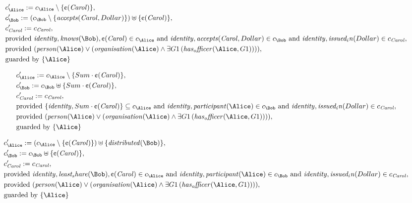 \begin{align*}
&
c'_
{
\Alice
}
 := 
c_
{
\Alice
}
 \setminus 
\{
\text{\textcent}
(
\mathit{Carol}
)
\}
,\\
&
c'_
{
\Bob
}
 := 
(c_
{
\Bob
}
 \setminus 
\{
\mathit{
accepts
}
(
\mathit{Carol}
,
Dollar
)
\}
) \uplus 
\{
\text{\textcent}
(
\mathit{Carol}
)
\}
,\\
&
c'_
{
\mathit{Carol}
}
 := 
c_
{
\mathit{Carol}
}
,\\
&
\text{provided } 
\mathit{
identity
}
,
\mathit{
knows
}
(
\Bob
)
,
\text{\textcent}
(
\mathit{Carol}
)
 \in c_
{
\Alice
}
 \text{ and } 
\mathit{
identity
}
,
\mathit{
accepts
}
(
\mathit{Carol}
,
Dollar
)
 \in c_
{
\Bob
}
 \text{ and } 
\mathit{
identity
}
,
\mathit{
issued_in
}
(
Dollar
)
 \in c_
{
\mathit{Carol}
}
,\\
&
\text{provided } 
(
\mathit{
person
}
(
\Alice
)
\lor
(
\mathit{
organisation
}
(
\Alice
)
\land
\exists 
G1
\,(
\mathit{
has_officer
}
(
\Alice
,
G1
)
)
)
)
,\\
&
\text{guarded by } \{
\Alice
\}
\end{align*}

\begin{align*}
&
c'_
{
\Alice
}
 := 
c_
{
\Alice
}
 \setminus 
\{
Sum
\cdot
\text{\textcent}
(
\mathit{Carol}
)
\}
,\\
&
c'_
{
\Bob
}
 := 
c_
{
\Bob
}
 \uplus 
\{
Sum
\cdot
\text{\textcent}
(
\mathit{Carol}
)
\}
,\\
&
c'_
{
\mathit{Carol}
}
 := 
c_
{
\mathit{Carol}
}
,\\
&
\text{provided } 
\{
\mathit{
identity
}
,
Sum
\cdot
\text{\textcent}
(
\mathit{Carol}
)
\}
 \subseteq c_
{
\Alice
}
 \text{ and } 
\mathit{
identity
}
,
\mathit{
participant
}
(
\Alice
)
 \in c_
{
\Bob
}
 \text{ and } 
\mathit{
identity
}
,
\mathit{
issued_in
}
(
Dollar
)
 \in c_
{
\mathit{Carol}
}
,\\
&
\text{provided } 
(
\mathit{
person
}
(
\Alice
)
\lor
(
\mathit{
organisation
}
(
\Alice
)
\land
\exists 
G1
\,(
\mathit{
has_officer
}
(
\Alice
,
G1
)
)
)
)
,\\
&
\text{guarded by } \{
\Alice
\}
\end{align*}

\begin{align*}
&
c'_
{
\Alice
}
 := 
(c_
{
\Alice
}
 \setminus 
\{
\text{\textcent}
(
\mathit{Carol}
)
\}
) \uplus 
\{
\mathit{
distributed
}
(
\Bob
)
\}
,\\
&
c'_
{
\Bob
}
 := 
c_
{
\Bob
}
 \uplus 
\{
\text{\textcent}
(
\mathit{Carol}
)
\}
,\\
&
c'_
{
\mathit{Carol}
}
 := 
c_
{
\mathit{Carol}
}
,\\
&
\text{provided } 
\mathit{
identity
}
,
\mathit{
least_share
}
(
\Bob
)
,
\text{\textcent}
(
\mathit{Carol}
)
 \in c_
{
\Alice
}
 \text{ and } 
\mathit{
identity
}
,
\mathit{
participant
}
(
\Alice
)
 \in c_
{
\Bob
}
 \text{ and } 
\mathit{
identity
}
,
\mathit{
issued_in
}
(
Dollar
)
 \in c_
{
\mathit{Carol}
}
,\\
&
\text{provided } 
(
\mathit{
person
}
(
\Alice
)
\lor
(
\mathit{
organisation
}
(
\Alice
)
\land
\exists 
G1
\,(
\mathit{
has_officer
}
(
\Alice
,
G1
)
)
)
)
,\\
&
\text{guarded by } \{
\Alice
\}
\end{align*}
